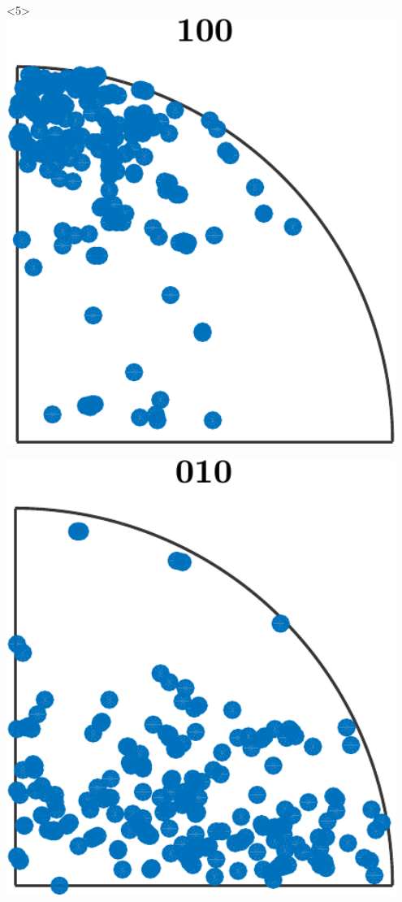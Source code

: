 \documentclass[compress]{beamer}
\begin{document}
\begin{frame}[fragile]
\begin{columns}
\begin{column}{3.5cm}
      \begin{onlyenv}<5>
        \includegraphics[width=0.95\textwidth]{pic/ipfSimple100}

        \medskip

        \includegraphics[width=0.95\textwidth]{pic/ipfSimple010}
      \end{onlyenv}


\end{column}
\end{columns}
\end{frame}
\end{document}
